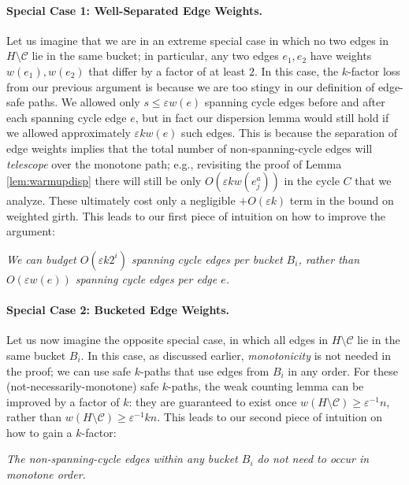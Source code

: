 \documentclass{article}\usepackage[a4paper,margin=20mm]{geometry}
\newcommand{\eps}{\varepsilon}
\newcommand{\cee}{\mathcal{C}}
\begin{document}
\paragraph{Special Case 1: Well-Separated Edge Weights.} Let us imagine that we are in an extreme special case in which no two edges in $H \setminus \cee$ lie in the same bucket; in particular, any two edges $e_1, e_2$ have weights $w(e_1), w(e_2)$ that differ by a factor of at least $2$.
In this case, the $k$-factor loss from our previous argument is because we are too stingy in our definition of edge-safe paths.
We allowed only $s \le \eps w(e)$ spanning cycle edges before and after each spanning cycle edge $e$, but in fact our dispersion lemma would still hold if we allowed approximately $\eps k w(e)$ such edges.
This is because the separation of edge weights implies that the total number of non-spanning-cycle edges will \emph{telescope} over the monotone path; e.g., revisiting the proof of Lemma \ref{lem:warmupdisp} there will still be only $O(\eps k w(e_j^a))$ in the cycle $C$ that we analyze.
These ultimately cost only a negligible $+O(\eps k)$ term in the bound on weighted girth.
This leads to our first piece of intuition on how to improve the argument:

\begin{center}
\emph{We can budget $O(\eps k 2^i)$ spanning cycle edges per bucket $B_i$, rather than $O(\eps w(e))$ spanning cycle edges per edge $e$.}
\end{center}

\paragraph{Special Case 2: Bucketed Edge Weights.} Let us now imagine the opposite special case, in which all edges in $H \setminus \cee$ lie in the same bucket $B_i$.
In this case, as discussed earlier, \emph{monotonicity} is not needed in the proof; we can use safe $k$-paths that use edges from $B_i$ in any order.
For these (not-necessarily-monotone) safe $k$-paths, the weak counting lemma can be improved by a factor of $k$: they are guaranteed to exist once $w(H \setminus \cee) \ge \eps^{-1} n$, rather than $w(H \setminus \cee) \ge \eps^{-1} kn$.
This leads to our second piece of intuition on how to gain a $k$-factor:
\begin{center}
\emph{The non-spanning-cycle edges within any bucket $B_i$ do not need to occur in monotone order.}
\end{center}
\end{document}
